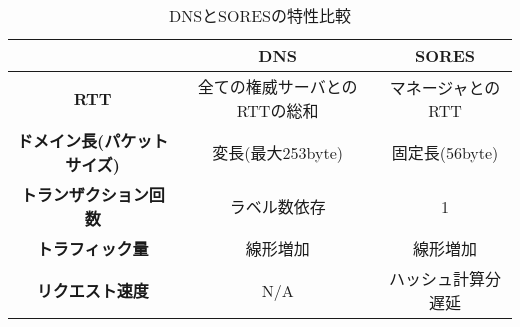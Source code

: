 \begin{table}[htb]
 \centering
  \begin{tabular}{ccc}
    \toprule
     & \textbf{DNS} & \textbf{SORES} \\
    \midrule
    \textbf{RTT} & 全ての権威サーバとのRTTの総和 & マネージャとのRTT  \\ \hline
		\textbf{ドメイン長(パケットサイズ)} & 変長(最大253byte) & 固定長(56byte)  \\ \hline
    \textbf{トランザクション回数} & ラベル数依存 & 1 \\ \hline
    \textbf{トラフィック量} & 線形増加 & 線形増加 \\ \hline
    \textbf{リクエスト速度} & N/A & ハッシュ計算分遅延 \\
    \bottomrule
  \end{tabular}
 \caption{DNSとSORESの特性比較}
 \label{tab:diff_sores_dns}
\end{table}
